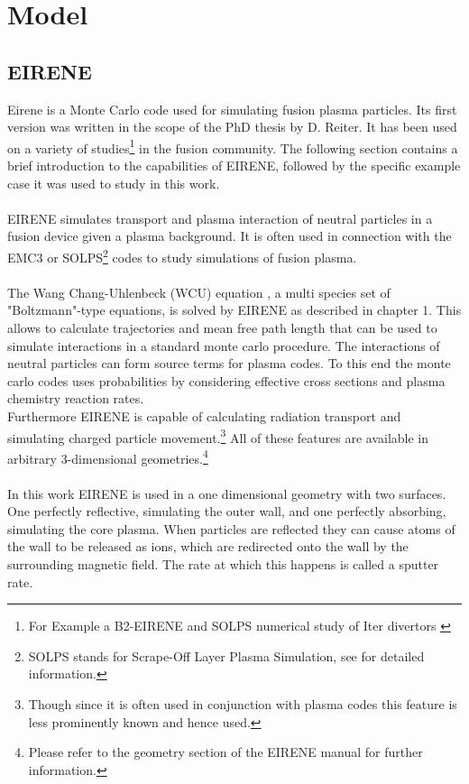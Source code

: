 \chapter{Model}
	\label{Chap:Model}
	\section{EIRENE}
		Eirene is a Monte Carlo code used for simulating fusion plasma particles. Its first version was written in the scope of the PhD thesis by D. Reiter. It has been used on a variety of studies\footnote{For Example a B2-EIRENE and SOLPS numerical study of Iter divertors \cite{EirStudy} } in the fusion community. The following section contains a brief introduction to the capabilities of EIRENE, followed by the specific example case it was used to study in this work.\\
		~\\
		EIRENE simulates transport and plasma interaction of neutral particles in a fusion device given a plasma background. It is often used in connection with the EMC3 or SOLPS\footnote{SOLPS stands for Scrape-Off Layer Plasma Simulation, see \cite{SOLPS} for detailed information.} codes to study simulations of fusion plasma.\\
		~\\
		The Wang Chang-Uhlenbeck (WCU) equation \cite{WCU}, a multi species set of "Boltzmann"-type equations, is solved by EIRENE as described in \cite{EIRENE} chapter 1. This allows to calculate trajectories and mean free path length that can be used to simulate interactions in a standard monte carlo procedure. The interactions of neutral particles can form source terms for plasma codes. To this end the monte carlo codes uses probabilities by considering effective cross sections and plasma chemistry reaction rates.\\
		Furthermore EIRENE is capable of calculating radiation transport and simulating charged particle movement.\footnote{Though since it is often used in conjunction with plasma codes this feature is less prominently known and hence used.} All of these features are available in arbitrary 3-dimensional geometries.\footnote{Please refer to the geometry section of the EIRENE manual \cite{EIRENE} for further information.}\\
		~\\
		In this work EIRENE is used in a one dimensional geometry with two surfaces. One perfectly reflective, simulating the outer wall, and one perfectly absorbing, simulating the core plasma. When particles are reflected they can cause atoms of the wall to be released as ions, which are redirected onto the wall by the surrounding magnetic field. The rate at which this happens is called a sputter rate.\\
